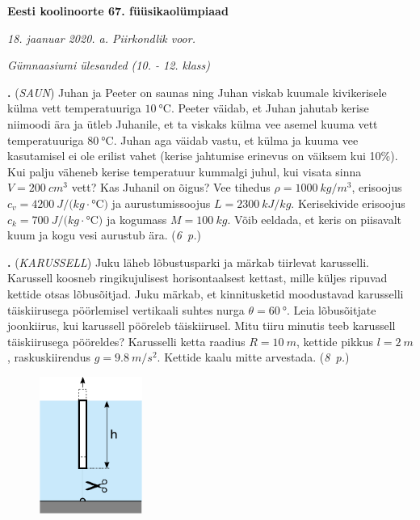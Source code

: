 \documentclass[12pt,a5paper]{article}
\newcommand{\numb}[1]{\vspace{5pt}\textbf{\large #1}}
\newcommand{\nimi}[1]{(\textsl{\small #1})}
\newcommand{\punktid}[1]{(\emph{#1~p.})}
\newcounter{ylesanne}
\newcommand{\yl}[1]{\addtocounter{ylesanne}{1}\numb{\theylesanne.} \nimi{#1} \newblock{}}
\begin{document}
\begin{center}
\textbf{\Large Eesti koolinoorte 67. füüsikaolümpiaad} \vspace{2pt}

\emph{18. jaanuar 2020. a. Piirkondlik voor.}

\emph{Gümnaasiumi ülesanded (10. - 12. klass)}

\end{center}

\yl{SAUN} Juhan ja Peeter on saunas ning Juhan viskab kuumale kivikerisele külma vett temperatuuriga $\SI{10}{\celsius}$. Peeter väidab, et Juhan jahutab kerise niimoodi ära ja ütleb Juhanile, et ta viskaks külma vee asemel kuuma vett temperatuuriga $\SI{80}{\celsius}$. Juhan aga väidab vastu, et külma ja kuuma vee kasutamisel ei ole erilist vahet (kerise jahtumise erinevus on väiksem kui 10\%). Kui palju väheneb kerise temperatuur kummalgi juhul, kui visata sinna $V=\SI{200}{cm^3}$ vett? Kas Juhanil on õigus? Vee tihedus $\rho=\SI{1000}{kg/m^3}$, erisoojus $c_v=\SI{4200}{J/(kg\cdot\celsius)}$ ja aurustumissoojus $L=\SI{2300}{kJ/kg}$. Kerisekivide erisoojus $c_k=\SI{700}{J/(kg\cdot\celsius)}$ ja kogumass $M=\SI{100}{kg}$. Võib eeldada, et keris on piisavalt kuum ja kogu vesi aurustub ära. \punktid{6}

\yl{KARUSSELL} Juku läheb lõbustusparki ja märkab tiirlevat karusselli. Karussell koosneb ringikujulisest horisontaalsest kettast, mille küljes ripuvad kettide otsas lõbusõitjad. Juku märkab, et kinnitusketid moodustavad karusselli täiskiirusega pöörlemisel vertikaali suhtes nurga $\theta = \SI{60}{\degree}$.  Leia lõbusõitjate joonkiirus, kui karussell pööreleb täiskiirusel. Mitu tiiru minutis teeb karussell täiskiirusega pööreldes? Karusselli ketta raadius $R=\SI{10}{m}$, kettide pikkus $l=\SI{2}{m}$, raskuskiirendus $g=\SI{9,8}{m / s^2}$. Kettide kaalu mitte arvestada. \punktid{8}


\begin{figure}
    \vspace{-30pt}
	\includegraphics[width=0.3\textwidth]{hyppav_silinder.pdf}
\end{figure}
\end{document}
